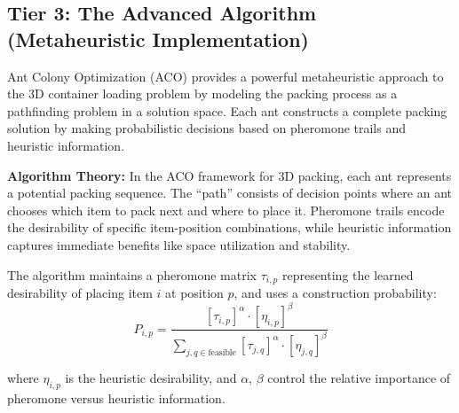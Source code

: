 \documentclass{article}
\begin{document}
\subsection{Tier 3: The Advanced Algorithm (Metaheuristic Implementation)}

Ant Colony Optimization (ACO) provides a powerful metaheuristic approach to the 3D container loading problem by modeling the packing process as a pathfinding problem in a solution space. Each ant constructs a complete packing solution by making probabilistic decisions based on pheromone trails and heuristic information.

\textbf{Algorithm Theory:}
In the ACO framework for 3D packing, each ant represents a potential packing sequence. The ``path'' consists of decision points where an ant chooses which item to pack next and where to place it. Pheromone trails encode the desirability of specific item-position combinations, while heuristic information captures immediate benefits like space utilization and stability.

The algorithm maintains a pheromone matrix $\tau_{i,p}$ representing the learned desirability of placing item $i$ at position $p$, and uses a construction probability:
\[P_{i,p} = \frac{[\tau_{i,p}]^\alpha \cdot [\eta_{i,p}]^\beta}{\sum_{j,q \in \text{feasible}} [\tau_{j,q}]^\alpha \cdot [\eta_{j,q}]^\beta}\]

where $\eta_{i,p}$ is the heuristic desirability, and $\alpha$, $\beta$ control the relative importance of pheromone versus heuristic information.
\end{document}
